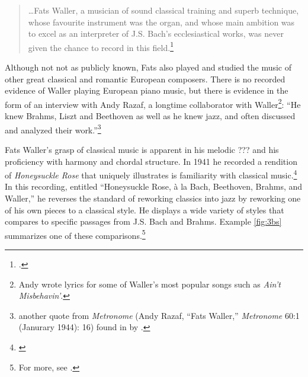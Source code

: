 \documentclass[11pt]{report}
\begin{document}
	\begin{quote}
		\ldots Fats Waller, a musician of sound classical training and superb technique, whose favourite instrument was the organ, and whose main ambition was to excel as an interpreter of J.S. Bach's ecclesiastical works, was never given the chance to record in this field.\footnote{\cite[209]{jazz_scene}.}
	\end{quote}
	
	Although not not as publicly known, Fats also played and studied the music of other great classical and romantic European composers. There is no recorded evidence of Waller playing European piano music, but there is evidence in the form of an interview with Andy Razaf, a longtime collaborator with Waller\footnote{Andy wrote lyrics for some of Waller's most popular songs such as \emph{Ain't Misbehavin'}.}: ``He knew Brahms, Liszt and Beethoven as well as he knew jazz, and often discussed and analyzed their work.''\footnote{another quote from \emph{Metronome} (Andy Razaf, ``Fats Waller,'' \emph{Metronome} 60:1 (Janurary 1944): 16) found in  by \cite{transcriptions}.}
	
	Fats Waller's grasp of classical music is apparent in his melodic ??? and his proficiency with harmony and chordal structure. In 1941 he recorded a rendition of \emph{Honeysuckle Rose} that uniquely illustrates is familiarity with classical music.\footnote{\cite{transcriptions}} In this recording, entitled ``Honeysuckle Rose, \`a la Bach, Beethoven, Brahms, and Waller,'' he reverses the standard of reworking classics into jazz by reworking one of his own pieces to a classical style. He displays a wide variety of styles that \citeauthor{transcriptions} compares to specific passages from J.S. Bach and Brahms. Example \ref{fig:3bs} summarizes one of these comparisons.\footnote{For more, see \cite{transcriptions}.}
\end{document}
